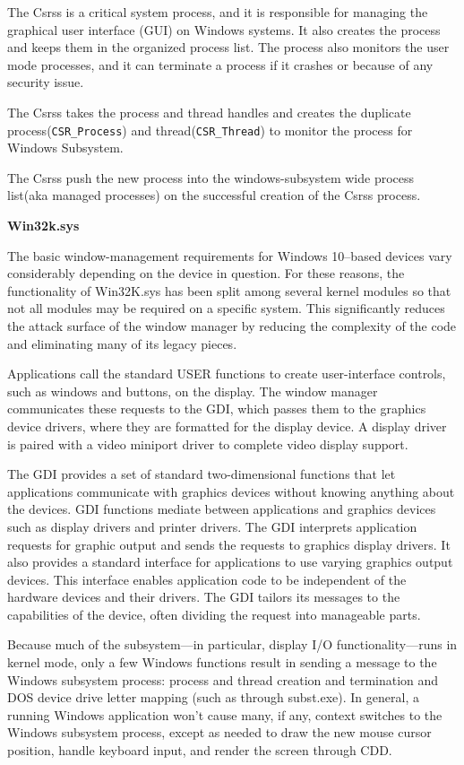 The Csrss is a critical system process, and it is responsible for managing the graphical user interface (GUI) on Windows systems. It also creates the process and keeps them in the organized process list. The process also monitors the user mode processes, and it can terminate a process if it crashes or because of any security issue.

The Csrss takes the process and thread handles and creates the duplicate process(\verb+CSR_Process+) and thread(\verb+CSR_Thread+) to monitor the process for Windows Subsystem.

The Csrss push the new process into the windows-subsystem wide process list(aka managed processes) on the successful creation of the Csrss process.


{\bf Win32k.sys}

The basic window-management requirements for Windows 10–based devices vary considerably depending on the device in question. For these reasons, the functionality of Win32K.sys has been split among  several kernel modules so that not all modules may be required on a specific system. This significantly reduces the attack surface of the window manager by reducing the complexity of the code and eliminating many of its legacy pieces.

Applications call the standard USER functions to create user-interface controls, such as windows and buttons, on the display. The window manager communicates these requests to the GDI, which passes them to the graphics device drivers, where they are formatted for the display device. A display driver is paired with a video miniport driver to complete video display support.

The GDI provides a set of standard two-dimensional functions that let applications communicate with graphics devices without knowing anything about the devices. GDI functions mediate between applications and graphics devices such as display drivers and printer drivers. The GDI interprets application requests for graphic output and sends the requests to graphics display drivers. It also provides a standard interface for applications to use varying graphics output devices. This interface enables application code to be independent of the hardware devices and their drivers. The GDI tailors its messages to the capabilities of the device, often dividing the request into manageable parts.

Because much of the subsystem—in particular, display I/O functionality—runs in kernel mode, only a few Windows functions result in sending a message to the Windows subsystem process: process and thread creation and termination and DOS device drive letter mapping (such as through subst.exe). In general, a running Windows application won’t cause many, if any, context switches to the Windows subsystem process, except as needed to draw the new mouse cursor position, handle keyboard input, and render the screen through CDD.

